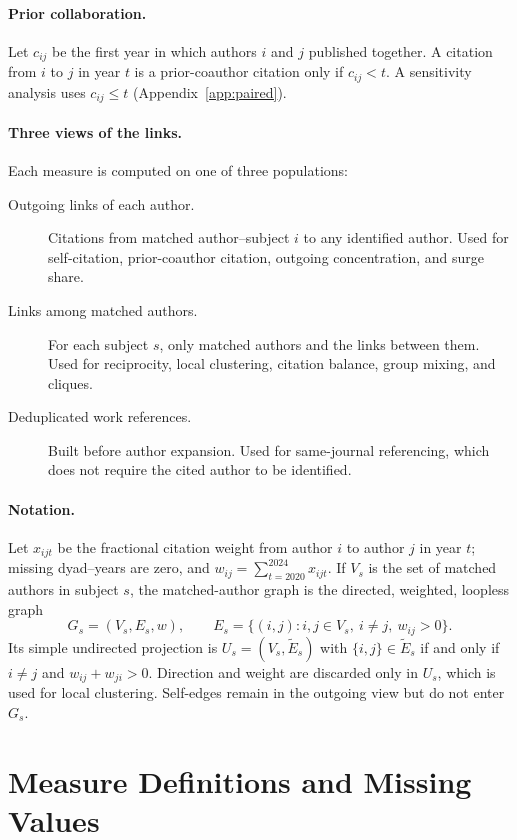 \documentclass[12pt]{article}
\begin{document}
\paragraph{Prior collaboration.}  Let $c_{ij}$ be the first year in which authors $i$ and $j$ published together.  A citation from $i$ to $j$ in year $t$ is a prior-coauthor citation only if $c_{ij}<t$.  A sensitivity analysis uses $c_{ij}\leq t$ (Appendix~\ref{app:paired}).

\paragraph{Three views of the links.}  Each measure is computed on one of three populations:
\begin{description}
  \item[Outgoing links of each author.] Citations from matched author--subject $i$ to any identified author.  Used for self-citation, prior-coauthor citation, outgoing concentration, and surge share.
  \item[Links among matched authors.] For each subject $s$, only matched authors and the links between them.  Used for reciprocity, local clustering, citation balance, group mixing, and cliques.
  \item[Deduplicated work references.] Built before author expansion.  Used for same-journal referencing, which does not require the cited author to be identified.
\end{description}

\paragraph{Notation.}  Let $x_{ijt}$ be the fractional citation weight from author $i$ to author $j$ in year $t$; missing dyad--years are zero, and $w_{ij}=\sum_{t=2020}^{2024}x_{ijt}$.  If $V_s$ is the set of matched authors in subject $s$, the matched-author graph is the directed, weighted, loopless graph
\begin{equation}
  G_s=(V_s,E_s,w),\qquad
  E_s=\{(i,j):i,j\in V_s,\ i\ne j,\ w_{ij}>0\}.
\end{equation}
Its simple undirected projection is $U_s=(V_s,\widetilde E_s)$ with $\{i,j\}\in\widetilde E_s$ if and only if $i\ne j$ and $w_{ij}+w_{ji}>0$.  Direction and weight are discarded only in $U_s$, which is used for local clustering.  Self-edges remain in the outgoing view but do not enter $G_s$.

\section{Measure Definitions and Missing Values}
\label{app:measures}
\end{document}
